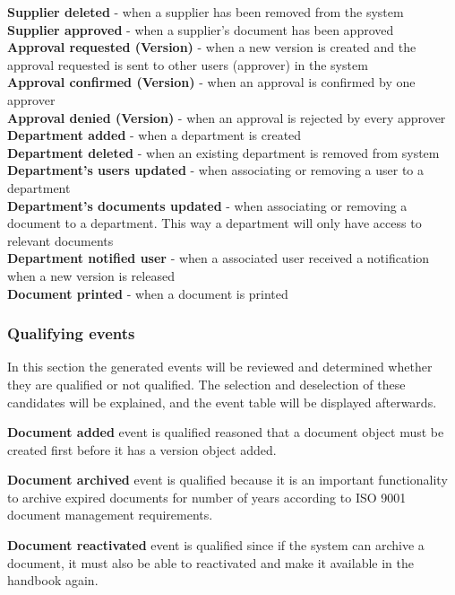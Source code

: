 \textbf{Supplier deleted} - when a supplier has been removed from the system\\
\textbf{Supplier approved} - when a supplier's document has been approved\\
\textbf{Approval requested (Version)} - when a new version is created and the approval requested is sent to other users (approver) in the system\\
\textbf{Approval confirmed (Version)} - when an approval is confirmed by one approver\\
\textbf{Approval denied (Version)} - when an approval is rejected by every approver\\
\textbf{Department added} - when a department is created\\
\textbf{Department deleted} - when an existing department is removed from system\\
\textbf{Department's users updated} - when associating or removing a user to a department\\
\textbf{Department's documents updated} - when associating or removing a document to a department. This way a department will only have access to relevant documents\\
\textbf{Department notified user} - when a associated user received a notification when a new version is released\\ 
\textbf{Document printed} - when a document is printed\\

\subsubsection{Qualifying events}
In this section the generated events will be reviewed and determined whether they are qualified or not qualified.
The selection and deselection of these candidates will be explained, and the event table will be displayed afterwards.

\textbf{Document added} event is qualified reasoned that a document object must be created first before it has a version object added. 

\textbf{Document archived} event is qualified because it is an important functionality to archive expired documents for number of years according to ISO 9001 document management requirements. 

\textbf{Document reactivated} event is qualified since if the system can archive a document, it must also be able to reactivated and make it available in the handbook again. 

